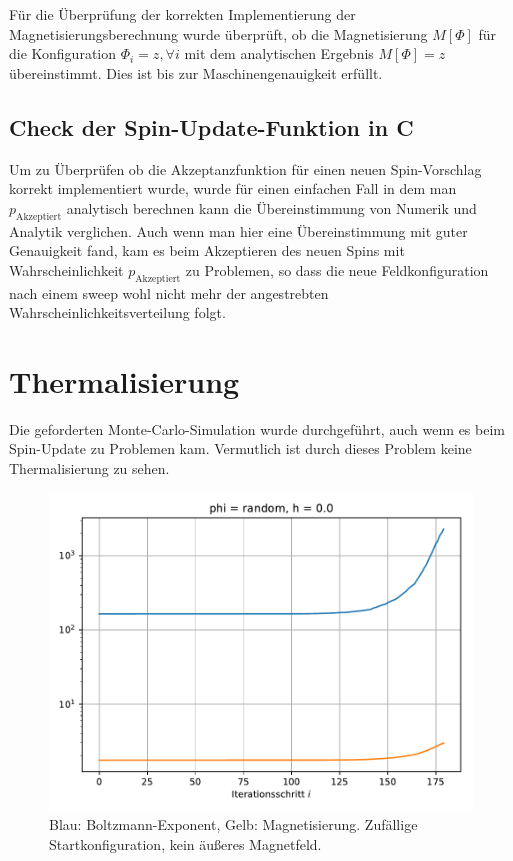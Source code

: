 \documentclass[10pt,a4paper]{article}
\begin{document}
Für die Überprüfung der korrekten Implementierung der Magnetisierungsberechnung wurde überprüft, ob die Magnetisierung $M[\Phi]$ für die Konfiguration
$\Phi_i = z, \forall i$ mit dem analytischen Ergebnis $M[\Phi]=z$ übereinstimmt. Dies ist bis zur Maschinengenauigkeit erfüllt.

\subsection{Check der Spin-Update-Funktion in C}

Um zu Überprüfen ob die Akzeptanzfunktion für einen neuen Spin-Vorschlag korrekt implementiert wurde, wurde für einen einfachen Fall in dem
man $p_\text{Akzeptiert}$ analytisch berechnen kann die Übereinstimmung von Numerik und Analytik verglichen. Auch wenn man hier eine Übereinstimmung mit guter Genauigkeit fand, kam es beim Akzeptieren des neuen Spins mit Wahrscheinlichkeit $p_\text{Akzeptiert}$ zu Problemen, so dass die neue Feldkonfiguration nach einem sweep wohl nicht mehr der angestrebten Wahrscheinlichkeitsverteilung folgt.

\section{Thermalisierung}

Die geforderten Monte-Carlo-Simulation wurde durchgeführt, auch wenn es beim Spin-Update zu Problemen kam. Vermutlich ist durch dieses Problem keine Thermalisierung zu sehen.

\begin{figure}[H]
  \centering
  \includegraphics[width=\textwidth]{../figures/phi_rand_h_nil.pdf}
  \caption{Blau: Boltzmann-Exponent, Gelb: Magnetisierung. Zufällige Startkonfiguration, kein äußeres Magnetfeld.}
\end{figure}
\end{document}
